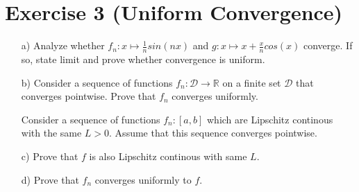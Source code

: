 \documentclass[10pt]{article}
\numberwithin{equation}{section}
\begin{document}
\section*{Exercise 3 (Uniform Convergence)}
\begin{enumerate}
\item[a)]{
    Analyze whether $f_n: x\mapsto \frac{1}{n}sin(nx)$ and $g: x \mapsto x + \frac{x}{n}cos(x)$ converge. If so, state limit and prove whether convergence is uniform.
  }
\item[b)]{
    Consider a sequence of functions $f_n: \mathcal{D} \rightarrow \mathbb{R}$ on a finite set $\mathcal{D}$ that converges pointwise. Prove that $f_n$ converges uniformly.
  }


\vspace{0.5cm}
  \hspace{-0.8cm}
  Consider a sequence of functions $f_n: [a,b]$ which are Lipschitz continous with the same $L > 0$. Assume that this sequence converges pointwise.
\item[c)]{
    Prove that $f$ is also Lipschitz continous with same $L$.
  }
\item[d)]{
    Prove that $f_n$ converges uniformly to $f$.
  }
\end{enumerate}
\end{document}
